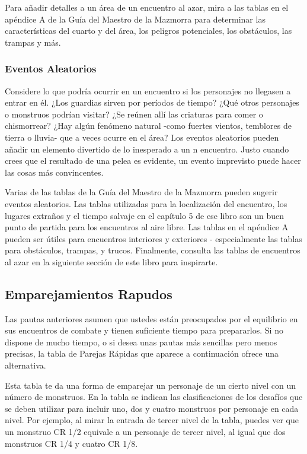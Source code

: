 \documentclass[a4paper,twocolumn,openany,10pt]{dndbook}
\begin{document}
Para añadir detalles a un área de un encuentro al azar, mira a las tablas en el apéndice A de la Guía del Maestro de la Mazmorra
para determinar las características del cuarto y del área, los peligros potenciales, los obstáculos, las trampas y más. 

\subsubsection*{Eventos Aleatorios}
Considere lo que podría ocurrir en un encuentro si los personajes no llegasen a entrar en él. ¿Los guardias sirven por períodos
de tiempo? ¿Qué otros personajes o monstruos podrían visitar? ¿Se reúnen allí las criaturas para comer o chismorrear? ¿Hay algún
fenómeno natural -como fuertes vientos, temblores de tierra o lluvia- que a veces ocurre en el área? Los eventos aleatorios
pueden añadir un elemento divertido de lo inesperado a un n encuentro. Justo cuando crees que el resultado de una pelea es
evidente, un evento imprevisto puede hacer las cosas más convincentes.

Varias de las tablas de la Guía del Maestro de la Mazmorra pueden sugerir eventos aleatorios. Las tablas utilizadas para la
localización del encuentro, los lugares extraños y el tiempo salvaje en el capítulo 5 de ese libro son un buen punto de partida
para los encuentros al aire libre. Las tablas en el apéndice A pueden ser útiles para encuentros interiores y exteriores -
especialmente las tablas para obstáculos, trampas, y trucos. Finalmente, consulta las tablas de encuentros al azar en la
siguiente sección de este libro para inspirarte. 

\subsection{Emparejamientos Rapudos}
Las pautas anteriores asumen que ustedes están preocupados por el equilibrio en sus encuentros de combate y tienen suficiente
tiempo para prepararlos. Si no dispone de mucho tiempo, o si desea unas pautas más sencillas pero menos precisas, la tabla de
Parejas Rápidas que aparece a continuación ofrece una alternativa.

Esta tabla te da una forma de emparejar un personaje de un cierto nivel con un número de monstruos. En la tabla se indican las
clasificaciones de los desafíos que se deben utilizar para incluir uno, dos y cuatro monstruos por personaje en cada nivel. Por
ejemplo, al mirar la entrada de tercer nivel de la tabla, puedes ver que un monstruo CR 1/2 equivale a un personaje de tercer
nivel, al igual que dos monstruos CR 1/4 y cuatro CR 1/8. 
\end{document}
